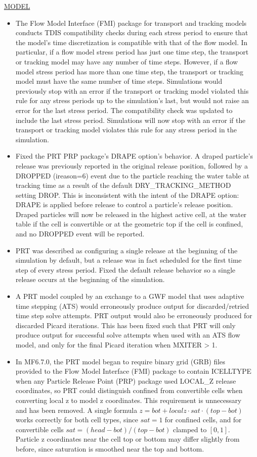 \underline{MODEL}
\begin{itemize}
\item The Flow Model Interface (FMI) package for transport and tracking models conducts TDIS compatibility checks during each stress period to ensure that the model's time discretization is compatible with that of the flow model. In particular, if a flow model stress period has just one time step, the transport or tracking model may have any number of time steps. However, if a flow model stress period has more than one time step, the transport or tracking model must have the same number of time steps. Simulations would previously stop with an error if the transport or tracking model violated this rule for any stress periods up to the simulation's last, but would not raise an error for the last stress period. The compatibility check was updated to include the last stress period. Simulations will now stop with an error if the transport or tracking model violates this rule for any stress period in the simulation.
\item Fixed the PRT PRP package's DRAPE option's behavior. A draped particle's release was previously reported in the original release position, followed by a DROPPED (ireason=6) event due to the particle reaching the water table at tracking time as a result of the default DRY\_TRACKING\_METHOD setting DROP. This is inconsistent with the intent of the DRAPE option: DRAPE is applied before release to control a particle's release position. Draped particles will now be released in the highest active cell, at the water table if the cell is convertible or at the geometric top if the cell is confined, and no DROPPED event will be reported.
\item PRT was described as configuring a single release at the beginning of the simulation by default, but a release was in fact scheduled for the first time step of every stress period. Fixed the default release behavior so a single release occurs at the beginning of the simulation.
\item A PRT model coupled by an exchange to a GWF model that uses adaptive time stepping (ATS) would erroneously produce output for discarded/retried time step solve attempts. PRT output would also be erroneously produced for discarded Picard iterations. This has been fixed such that PRT will only produce output for successful solve attempts when used with an ATS flow model, and only for the final Picard iteration when MXITER > 1.
\item In MF6.7.0, the PRT model began to require binary grid (GRB) files provided to the Flow Model Interface (FMI) package to contain ICELLTYPE when any Particle Release Point (PRP) package used LOCAL\_Z release coordinates, so PRT could distinguish confined from convertible cells when converting local z to model z coordinates. This requirement is unnecessary and has been removed. A single formula $z = bot + localz \cdot sat \cdot (top - bot)$ works correctly for both cell types, since $sat = 1$ for confined cells, and for convertible cells $sat = (head - bot) / (top - bot)$ clamped to $[0, 1]$. Particle z coordinates near the cell top or bottom may differ slightly from before, since saturation is smoothed near the top and bottom.

\end{itemize}
